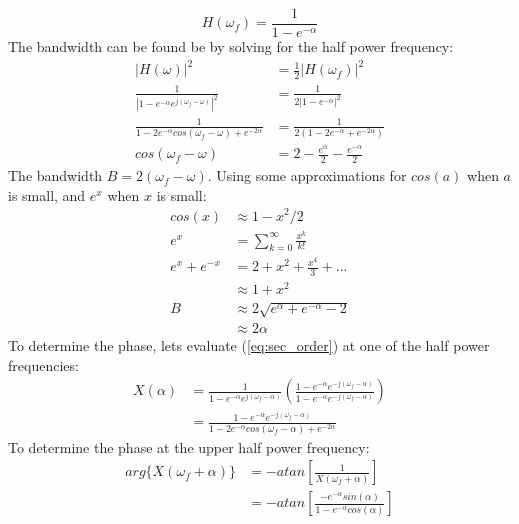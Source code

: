 \documentclass{article}
\begin{document}
\begin{equation}
H(\omega_f) = \frac{1}{1-e^{-\alpha}}	
\end{equation}
The bandwidth can be found be by solving for the half power frequency:
\begin{equation}
\begin{split}
|H(\omega)|^2 &= \frac{1}{2}|H(\omega_f)|^2 \\
\frac{1}{|1 - e^{-\alpha}e^{j (\omega_f - \omega)}|^2} &= \frac{1}{2|1-e^{-\alpha}|^2} \\
\frac{1}{1 - 2e^{-\alpha}cos(\omega_f - \omega) + e^{-2\alpha}} &= \frac{1}{2(1-2e^{-\alpha} + e^{-2 \alpha})} \\
cos(\omega_f - \omega) &= 2 - \frac{e^{\alpha}}{2} - \frac{e^{-\alpha}}{2}
\end{split}
\end{equation}
The bandwidth $B=2(\omega_f - \omega)$.  Using some approximations for $cos(a)$ when $a$ is small, and $e^x$ when $x$ is small:
\begin{equation}
\begin{split}
cos(x) &\approx 1-x^2/2 \\
e^x &= \sum_{k=0}^{\infty}\frac{x^k}{k!} \\
e^x + e^{-x} &= 2 + x^2 + \frac{x^4}{3} + ... \\
             &\approx 1 + x^2     \\
B &\approx 2\sqrt{e^\alpha+e^{-\alpha}-2} \\
  &\approx 2\alpha
\end{split}
\end{equation}
To determine the phase, lets evaluate (\ref{eq:sec_order}) at one of the half power frequencies:
\begin{equation}
\begin{split}
X(\alpha) &= \frac{1}{1 - e^{-\alpha}e^{j (\omega_f - \alpha)}} \left(\frac{1 - e^{-\alpha}e^{-j (\omega_f - \alpha)}}{1 - e^{-\alpha}e^{-j (\omega_f - \alpha)}} \right)\\
         &= \frac{1 - e^{-\alpha}e^{-j (\omega_f - \alpha)}}{1-2e^{-\alpha}cos(\omega_f-\alpha) + e^{-2\alpha}}
\end{split}
\end{equation}
To determine the phase at the upper half power frequency:
\begin{equation}
\begin{split}
arg\{X(\omega_f + \alpha)\} &= -atan\left[\frac{1}{X(\omega_f+\alpha)}\right] \\
                 &= - atan\left[\frac{-e^{-\alpha}sin(\alpha)}{1-e^{-\alpha} cos(\alpha)}\right]
\end{split}
\end{equation}
\end{document}
